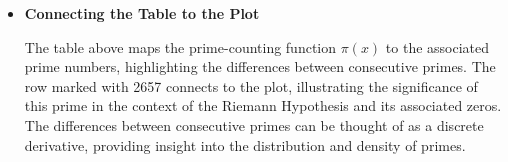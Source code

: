 \documentclass{article}
\begin{document}
\begin{itemize}
    \item \textbf{Connecting the Table to the Plot}
    \par
    The table above maps the prime-counting function $\pi(x)$ to the associated prime numbers, highlighting the differences between consecutive primes. The row marked with 2657 connects to the plot, illustrating the significance of this prime in the context of the Riemann Hypothesis and its associated zeros. The differences between consecutive primes can be thought of as a discrete derivative, providing insight into the distribution and density of primes.
\end{itemize}
\end{document}
